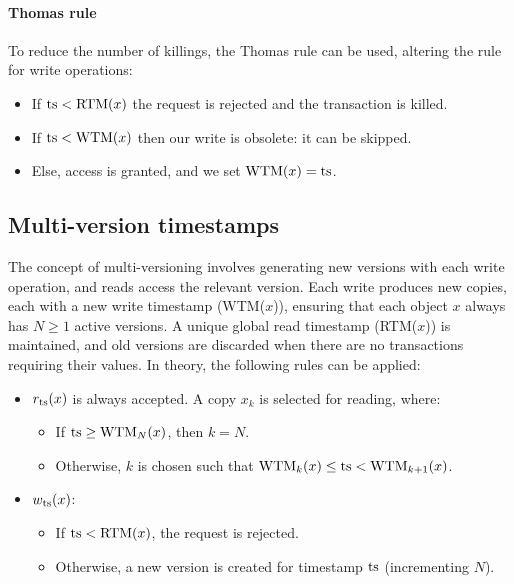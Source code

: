 \paragraph*{Thomas rule}
To reduce the number of killings, the Thomas rule can be used, altering the rule for write operations:
\begin{itemize}
    \item If $\textnormal{ts}<\textnormal{RTM}(x)$ the request is rejected and the transaction is killed. 
    \item If $\textnormal{ts}<\textnormal{WTM}(x)$ then our write is obsolete: it can be skipped. 
    \item Else, access is granted, and we set $\textnormal{WTM}(x)=\textnormal{ts}$. 
\end{itemize}

\subsection{Multi-version timestamps}
The concept of multi-versioning involves generating new versions with each write operation, and reads access the relevant version.
Each write produces new copies, each with a new write timestamp (WTM($x$)), ensuring that each object $x$ always has $N \geq 1$ active versions.
A unique global read timestamp (RTM($x$)) is maintained, and old versions are discarded when there are no transactions requiring their values.
In theory, the following rules can be applied:
\begin{itemize}
    \item $r_{\textnormal{ts}}(x)$ is always accepted. A copy $x_k$ is selected for reading, where:
        \begin{itemize}
            \item If $\textnormal{ts} \geq \textnormal{WTM}_N(x)$, then $k=N$.
            \item Otherwise, $k$ is chosen such that $\textnormal{WTM}_k(x) \leq \textnormal{ts} < \textnormal{WTM}_{k+1}(x)$. 
        \end{itemize}
    \item $w_{\textnormal{ts}}(x)$: 
        \begin{itemize}
            \item If $\textnormal{ts} < \textnormal{RTM}(x)$, the request is rejected. 
            \item  Otherwise, a new version is created for timestamp $\textnormal{ts}$ (incrementing $N$).
        \end{itemize}
\end{itemize}
